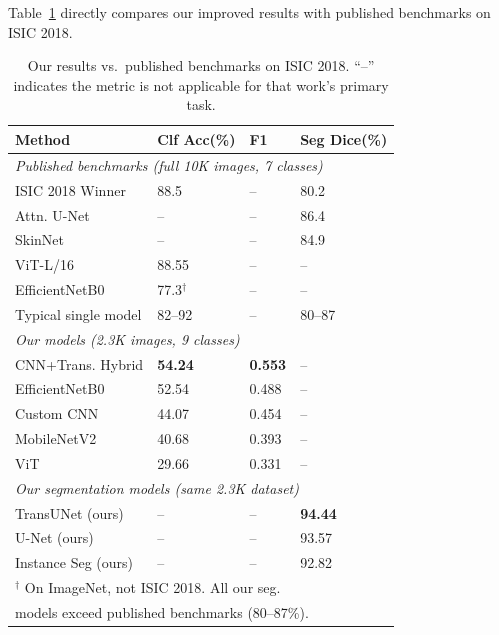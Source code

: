\documentclass[10pt,twocolumn]{article}
\begin{document}
Table~\ref{tab:lit_results_comparison} directly compares our improved results with published benchmarks on ISIC 2018.

\begin{table}[htbp]
\centering
\caption{Our results vs.\ published benchmarks on ISIC 2018. ``--'' indicates the metric is not applicable for that work's primary task.}
\label{tab:lit_results_comparison}
\small
\begin{tabular}{lp{1.3cm}p{0.7cm}p{1.3cm}}
\toprule
\textbf{Method} & \textbf{Clf Acc(\%)} & \textbf{F1} & \textbf{Seg Dice(\%)} \\
\midrule
\multicolumn{4}{l}{\textit{Published benchmarks (full 10K images, 7 classes)}} \\
ISIC 2018 Winner \cite{Codella2018} & 88.5 & -- & 80.2 \\
Attn. U-Net \cite{Abraham2019} & -- & -- & 86.4 \\
SkinNet \cite{Vesal2018} & -- & -- & 84.9 \\
ViT-L/16 \cite{Dosovitskiy2021} & 88.55 & -- & -- \\
EfficientNetB0 \cite{EfficientNet2019} & 77.3$^\dagger$ & -- & -- \\
Typical single model \cite{Kassem2024} & 82--92 & -- & 80--87 \\
\midrule
\multicolumn{4}{l}{\textit{Our models (2.3K images, 9 classes)}} \\
CNN+Trans. Hybrid & \textbf{54.24} & \textbf{0.553} & -- \\
EfficientNetB0    & 52.54 & 0.488 & -- \\
Custom CNN        & 44.07 & 0.454 & -- \\
MobileNetV2       & 40.68 & 0.393 & -- \\
ViT               & 29.66 & 0.331 & -- \\
\midrule
\multicolumn{4}{l}{\textit{Our segmentation models (same 2.3K dataset)}} \\
TransUNet (ours)   & -- & -- & \textbf{94.44} \\
U-Net (ours)       & -- & -- & 93.57 \\
Instance Seg (ours)& -- & -- & 92.82 \\
\bottomrule
\multicolumn{4}{l}{\small $^\dagger$ On ImageNet, not ISIC 2018. All our seg.} \\
\multicolumn{4}{l}{\small models exceed published benchmarks (80--87\%).} \\
\end{tabular}
\end{table}
\end{document}
